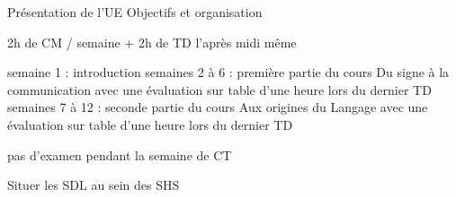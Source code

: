 Présentation de l'UE
Objectifs et organisation 

2h de CM / semaine
+ 2h de TD l'après midi même 

semaine 1 : introduction
semaines 2 à 6 : première partie du cours 
                  Du signe à la communication 
                  avec une évaluation sur table d'une heure lors du dernier TD
semaines 7 à 12 : seconde partie du cours 
                  Aux origines du Langage
                  avec une évaluation sur table d'une heure lors du dernier TD

pas d'examen pendant la semaine de CT






Situer les SDL au sein des SHS


